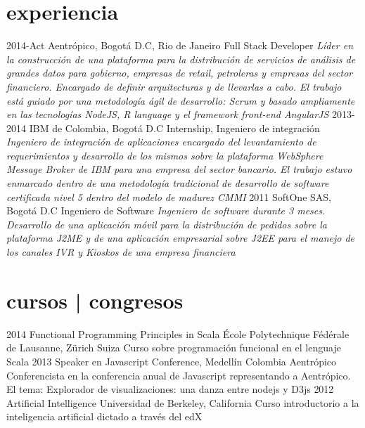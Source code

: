 \documentclass[]{friggeri-cv}
\begin{document}
\section{experiencia}

\begin{entrylist}
  \entry
    {2014-Act}
    {Aentrópico, Bogotá D.C, Rio de Janeiro}
    {Full Stack Developer}
    {\emph{Líder en la construcción de una plataforma para la distribución de servicios de análisis de grandes datos para gobierno, empresas de retail, petroleras y empresas del sector financiero. Encargado de definir arquitecturas y de llevarlas a cabo. El trabajo está guiado por una metodología ágil de desarrollo: Scrum y basado ampliamente en las tecnologías NodeJS, R language y el framework front-end AngularJS}}
  \entry
    {2013-2014}
    {IBM de Colombia, Bogotá D.C}
    {Internship, Ingeniero de integración}
    {\emph{Ingeniero de integración de aplicaciones encargado del levantamiento de requerimientos y desarrollo de los mismos sobre la plataforma WebSphere Message Broker de IBM para una empresa del sector bancario. El trabajo estuvo enmarcado dentro de una metodología tradicional de desarrollo de software certificada nivel 5 dentro del modelo de madurez CMMI}}
  \entry
    {2011}
    {SoftOne SAS, Bogotá D.C}
    {Ingeniero de Software}
    {\emph{Ingeniero de software durante 3 meses. Desarrollo de una aplicación móvil para la distribución de pedidos sobre la plataforma J2ME y de una aplicación empresarial sobre J2EE para el manejo de los canales IVR y Kioskos de una empresa financiera}}
\end{entrylist}


\section{cursos | congresos}

\begin{entrylist}
  \entry
    {2014}
    {Functional Programming Principles in Scala}
    {École Polytechnique Fédérale de Lausanne, Zürich Suiza}
    {Curso sobre programación funcional en el lenguaje Scala}
  \entry
    {2013}
    {Speaker en Javascript Conference, Medellín Colombia}
    {Aentrópico}
    {Conferencista en la conferencia anual de Javascript representando a Aentrópico. El tema: Explorador de visualizaciones: una danza entre nodejs y D3js}
  \entry
    {2012}
    {Artificial Intelligence}
    {Universidad de Berkeley, California}
    {Curso introductorio a la inteligencia artificial dictado a través del edX}
\end{entrylist}
\end{document}
